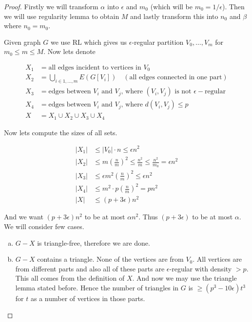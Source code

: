 \begin{proof}
	Firstly we will transform $\alpha$ into $\epsilon$ and $m_0$ (which will be $m_0 = 1/\epsilon$). Then we will use regularity lemma to obtain $M$ and lastly transform this into $n_0$ and $\beta$ where $n_0 = m_0$.
	
	Given graph $G$ we use RL which gives us $\epsilon$-regular partition $V_0, \dots, V_m$ for $m_0 \leq m \leq M$. Now lets denote
	
	$$
	\begin{aligned}
		X_1 &= \text{all edges incident to vertices in } V_0 \\
		X_2 &= \bigcup_{i \in 1, \dots, m} E(G[V_{i}]) \quad (\text{all edges connected in one part})\\
		X_3 &= \text{edges between } V_i \text{ and } V_j \text{, where } (V_i, V_j) \text{ is not } \epsilon-\text{regular} \\
		X_4 &= \text{edges between } V_i \text{ and } V_j \text{, where } d(V_i, V_j) \leq p \\
		X &= X_1 \cup X_2 \cup X_3 \cup X_4
	\end{aligned}
	$$
	
	Now lets compute the sizes of all sets.
	
	$$
	\begin{aligned}
		|X_1| &\leq |V_0| \cdot n \leq \epsilon n^2 \\
		|X_2| &\leq m \left( \frac{n}{m} \right)^2 \leq \frac{n^2}{m} \leq \frac{n^2}{m_0} = \epsilon n^2 \\
		|X_3| &\leq \epsilon m^2 \left( \frac{n}{m} \right)^2 \leq \epsilon n^2 \\
		|X_4| &\leq m^2 \cdot p \left( \frac{n}{m} \right)^2 = p n^2\\
		|X| &\leq (p + 3\epsilon) n^2
	\end{aligned}
	$$
	
	And we want $(p + 3\epsilon) n^2$ to be at most $\alpha n^2$. Thus $(p + 3\epsilon)$ to be at most $\alpha$. We will consider few cases.
	
	\begin{enumerate}[(a)]
		\item $G-X$ is triangle-free, therefore we are done.
		\item $G-X$ contains a triangle. None of the vertices are from $V_0$. All vertices are from different parts and also all of these parts are $\epsilon$-regular with density $> p$. This all comes from the definition of $X$. And now we may use the triangle lemma stated before. Hence the number of triangles in $G$ is $\geq (p^3 - 10\epsilon) t^3$ for $t$ as a number of vertices in those parts.
		

\end{enumerate}
\end{proof}
